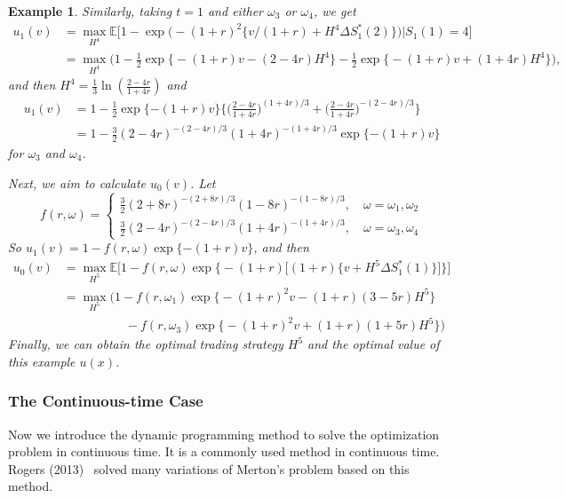 \documentclass[a4paper]{article}
\newtheorem{exa}{Example}[section]
\theoremstyle{definition}
\numberwithin{equation}{section}
\begin{document}
\begin{exa}
Similarly, taking $t=1$ and either $\omega_3$ or $\omega_4$, we get
\begin{equation}\nonumber
\begin{aligned}
u_1(v)&=\max_{H^4}\mathbb E\Big[1-\exp\Big(-(1+r)^2\big\{v/(1+r)+H^4\Delta S^*_1(2)\big\}\Big)\Big\lvert S_1(1)=4\Big]\\
&=\max_{H^4}\Big(1-\frac{1}{2}\exp\big\{-(1+r)v-(2-4r)H^4\big\}-\frac{1}{2}\exp\big\{-(1+r)v+(1+4r)H^4\big\}\Big),
\end{aligned}
\end{equation}
and then $H^4=\frac{1}{3}\ln(\frac{2-4r}{1+4r})$ and
\begin{equation}\nonumber
\begin{aligned}
u_1(v)&=1-\frac{1}{2}\exp\{-(1+r)v\}\Big\{\Big(\frac{2-4r}{1+4r}\Big)^{(1+4r)/3}+\Big(\frac{2-4r}{1+4r}\Big)^{-(2-4r)/3}\Big\}\\
&=1-\frac{3}{2}(2-4r)^{-(2-4r)/3}(1+4r)^{-(1+4r)/3}\exp\{-(1+r)v\}
\end{aligned}
\end{equation}
for $\omega_3$ and $\omega_4$.

Next, we aim to calculate $u_0(v)$. Let
\begin{equation}\nonumber
f(r,\omega)=\left\{
\begin{aligned}
\frac{3}{2}(2+8r)^{-(2+8r)/3}(1-8r)^{-(1-8r)/3},\quad \omega=\omega_1,\omega_2\\
\frac{3}{2}(2-4r)^{-(2-4r)/3}(1+4r)^{-(1+4r)/3},\quad \omega=\omega_3,\omega_4
\end{aligned}
\right.
\end{equation}
So $u_1(v)=1-f(r,\omega)\exp\{-(1+r)v\}$, and then
\begin{equation}\nonumber
\begin{aligned}
u_0(v)&=\max_{H^5}\mathbb E\Big[1-f(r,\omega)\exp\Big\{-(1+r)\big[(1+r)\big\{v+H^5\Delta S^*_1(1)\big\}\big]\Big\}\Big]\\
&=\max_{H^5}\Big(1-f(r,\omega_1)\exp\big\{-(1+r)^2v-(1+r)(3-5r)H^5\big\}\\
&\qquad\qquad\quad-f(r,\omega_3)\exp\big\{-(1+r)^2v+(1+r)(1+5r)H^5\big\}\Big)
\end{aligned}
\end{equation}
Finally, we can obtain the optimal trading strategy $H^5$ and the optimal value of this example $u(x)$.
\end{exa}

\subsubsection{The Continuous-time Case}\label{sec:DPM_continuous}
Now we introduce the dynamic programming method to solve the optimization problem in continuous time. It is a commonly used method in continuous time. Rogers (2013)~\cite{book3} solved many variations of Merton's problem based on this method.
\end{document}
